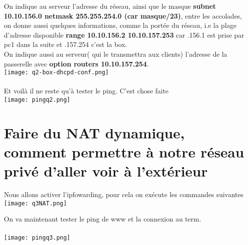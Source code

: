 \documentclass{article}
\begin{document}
On indique au serveur l'adresse du réseau, ainsi que le masque \textbf{subnet 10.10.156.0 netmask 255.255.254.0 (car masque/23)}, entre les accolades, on donne aussi quelques informations, comme la portée du réseau, i.e la plage d'adresse disponible \textbf{range 10.10.156.2 10.10.157.253} car .156.1 est prise par pc1 dans la suite et .157.254 c'est la box.\\On indique aussi au serveur( qui le transmettra aux clients) l'adresse de la passerelle avec \textbf{option routers 10.10.157.254}.\\

\texttt{[image: q2-box-dhcpd-conf.png]}\\\\
Et voilà il ne reste qu'à tester le ping. C'est chose faite \\

\texttt{[image: pingq2.png]}
\newpage

\section{Faire du NAT dynamique, comment permettre à notre réseau privé d'aller voir à l'extérieur}
Nous allons activer l'ipfowarding, pour cela on exécute les commandes suivantes\\

\texttt{[image: q3NAT.png]}

\newpage

On va maintenant tester le ping de www et la connexion au term.\\\\

\texttt{[image: pingq3.png]}
\end{document}
